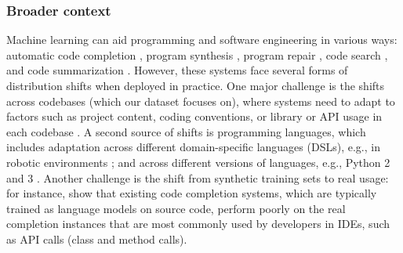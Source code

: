 \begin{table}[tbp]
\caption{Baseline results on \Py. We report both the model's accuracy on predicting class and method tokens and accuracy on all tokens trained using ERM, CORAL, IRM and group DRO. Standard deviations over 3 trials are in parentheses.}
  \centering
{}
\label{tab:results_py150}
\end{table}


\subsubsection{Broader context}
Machine learning can aid programming and software engineering in various ways:
automatic code completion \citep{raychev2014code,svyatkovskiy2019pythia},
program synthesis \citep{bunel2018leveraging,kulal2019spoc},
program repair \citep{vasic2019neural,yasunaga2020graph},
code search \citep{husain2019codesearchnet},
and code summarization \citep{allamanis2015suggesting}.
However, these systems face several forms of distribution shifts when deployed in practice.
One major challenge is the shifts across codebases (which our \Py dataset focuses on), where systems need to adapt to factors such as project content, coding conventions, or library or API usage in each codebase \citep{nita2010using,allamanis2017smartpaste}.
A second source of shifts is programming languages, which includes adaptation across different domain-specific languages (DSLs), e.g., in robotic environments \citep{shin2019synthetic};
and across different versions of languages, e.g., Python 2 and 3 \citep{malloy2017quantifying}.
Another challenge is the shift from synthetic training sets to real usage: for instance, \cite{hellendoorn2019code} show that existing code completion systems, which are typically trained as language models on source code, perform poorly on the real completion instances that are most commonly used by developers in IDEs, such as API calls (class and method calls).

